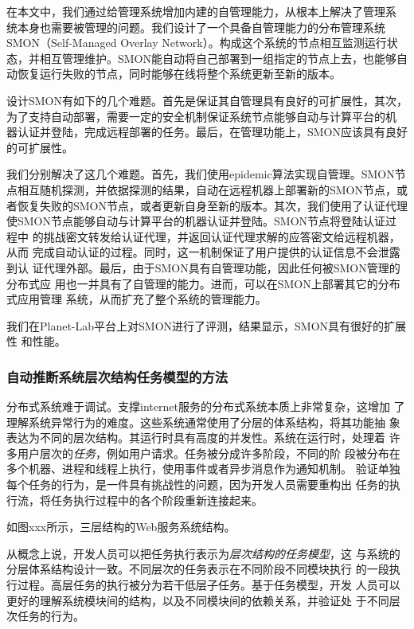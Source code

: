 在本文中，我们通过给管理系统增加内建的自管理能力，从根本上解决了管理系
统本身也需要被管理的问题。我们设计了一个具备自管理能力的分布管理系统
SMON（Self-Managed Overlay Network）。构成这个系统的节点相互监测运行状
态，并相互管理维护。SMON能自动将自己部署到一组指定的节点上去，也能够自
动恢复运行失败的节点，同时能够在线将整个系统更新至新的版本。

设计SMON有如下的几个难题。首先是保证其自管理具有良好的可扩展性，其次，
为了支持自动部署，需要一定的安全机制保证系统节点能够自动与计算平台的机
器认证并登陆，完成远程部署的任务。最后，在管理功能上，SMON应该具有良好
的可扩展性。

我们分别解决了这几个难题。首先，我们使用epidemic算法实现自管理。SMON节
点相互随机探测，并依据探测的结果，自动在远程机器上部署新的SMON节点，或
者恢复失败的SMON节点，或者更新自身至新的版本。其次，我们使用了认证代理
使SMON节点能够自动与计算平台的机器认证并登陆。SMON节点将登陆认证过程中
的挑战密文转发给认证代理，并返回认证代理求解的应答密文给远程机器，从而
完成自动认证的过程。同时，这一机制保证了用户提供的认证信息不会泄露到认
证代理外部。最后，由于SMON具有自管理功能，因此任何被SMON管理的分布式应
用也一并具有了自管理的能力。进而，可以在SMON上部署其它的分布式应用管理
系统，从而扩充了整个系统的管理能力。

我们在Planet-Lab平台上对SMON进行了评测，结果显示，SMON具有很好的扩展性
和性能。

\subsubsection*{自动推断系统层次结构任务模型的方法}

分布式系统难于调试。支撑internet服务的分布式系统本质上非常复杂，这增加
了理解系统异常行为的难度。这些系统通常使用了分层的体系结构，将其功能抽
象表达为不同的层次结构。其运行时具有高度的并发性。系统在运行时，处理着
许多用户层次的\emph{任务}，例如用户请求。任务被分成许多阶段，不同的阶
段被分布在多个机器、进程和线程上执行，使用事件或者异步消息作为通知机制。
验证单独每个任务的行为，是一件具有挑战性的问题，因为开发人员需要重构出
任务的执行流，将任务执行过程中的各个阶段重新连接起来。

如图xxx所示，三层结构的Web服务系统结构。

从概念上说，开发人员可以把任务执行表示为\emph{层次结构的任务模型}，这
与系统的分层体系结构设计一致。不同层次的任务表示在不同阶段不同模块执行
的一段执行过程。高层任务的执行被分为若干低层子任务。基于任务模型，开发
人员可以更好的理解系统模块间的结构，以及不同模块间的依赖关系，并验证处
于不同层次任务的行为。

